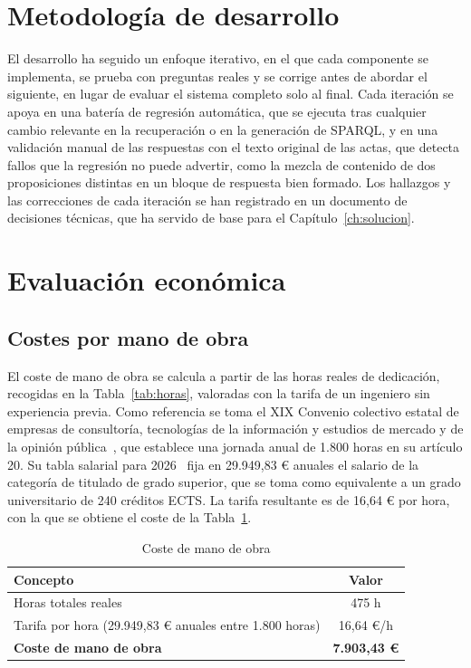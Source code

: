\documentclass[11pt, a4paper]{report}
\begin{document}
	\section{Metodología de desarrollo}

	El desarrollo ha seguido un enfoque iterativo, en el que cada componente se implementa, se prueba con preguntas reales y se corrige antes de abordar el siguiente, en lugar de evaluar el sistema completo solo al final. Cada iteración se apoya en una batería de regresión automática, que se ejecuta tras cualquier cambio relevante en la recuperación o en la generación de SPARQL, y en una validación manual de las respuestas con el texto original de las actas, que detecta fallos que la regresión no puede advertir, como la mezcla de contenido de dos proposiciones distintas en un bloque de respuesta bien formado. Los hallazgos y las correcciones de cada iteración se han registrado en un documento de decisiones técnicas, que ha servido de base para el Capítulo~\ref{ch:solucion}.

	\section{Evaluación económica}
	\label{sec:costes-hardware}

	\subsection{Costes por mano de obra}

	El coste de mano de obra se calcula a partir de las horas reales de dedicación, recogidas en la Tabla~\ref{tab:horas}, valoradas con la tarifa de un ingeniero sin experiencia previa. Como referencia se toma el XIX Convenio colectivo estatal de empresas de consultoría, tecnologías de la información y estudios de mercado y de la opinión pública~\cite{boe2025-convenio-consultoria}, que establece una jornada anual de 1.800 horas en su artículo 20. Su tabla salarial para 2026~\cite{boe2026-tablas-salariales} fija en 29.949,83 € anuales el salario de la categoría de titulado de grado superior, que se toma como equivalente a un grado universitario de 240 créditos ECTS. La tarifa resultante es de 16,64 € por hora, con la que se obtiene el coste de la Tabla~\ref{tab:coste-mano-obra}.

	\begin{table}[H]
		\centering
		\begin{tabular}{|l|c|}
			\hline
			\rowcolor{tabla-header}
			\textbf{Concepto} & \textbf{Valor} \\
			\hline
			Horas totales reales & 475 h \\
			\hline
			\rowcolor{fila-alterna}
			Tarifa por hora (29.949,83 € anuales entre 1.800 horas) & 16,64 €/h \\
			\hline
			\textbf{Coste de mano de obra} & \textbf{7.903,43 €} \\
			\hline
		\end{tabular}
		\caption{Coste de mano de obra}
		\label{tab:coste-mano-obra}
	\end{table}
\end{document}
